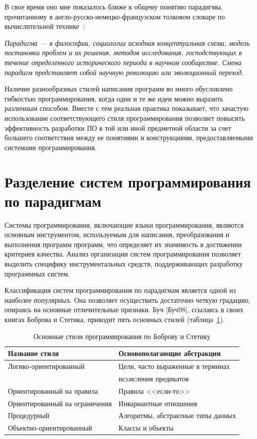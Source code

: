В свое время оно мне показалось ближе к общему понятию парадигмы, прочитанному в англо-русско-немецко-французском толковом словаре по вычислительной технике~\cite{ERD-dict}:

\textit{Парадигма --- в философии, социологии исходная концептуальная схема, модель постановки проблем и их решения, методов исследования, господствующих в течение определенного исторического периода в научном сообществе. Смена парадигм представляет собой научную революцию или  эволюционный переход.}

Наличие разнообразных стилей написания программ во много обусловлено гибкостью программирования, когда одни и те же идеи можно выразить различным способом. Вместе с тем реальная практика показывает, что зачастую использование соответствующего стиля программирования позволяет повысить эффективность разработки ПО в той или иной предметной области за счет большего соответствия между ее понятиями и конструкциями, предоставляемыми системами программирования.

\section{Разделение систем программирования по парадигмам}

Системы программирования, включающие языки программирования, являются основным инструментом, используемым для написания, преобразования и выполнения программ программ, что определяет их значимость в достижении критериев качества. Анализ организации систем программирования позволяет выделить специфику инструментальных средств, поддерживающих разработку программных систем.

Классификация систем программирования по парадигмам является одной из наиболее популярных. Она позволяет осуществить достаточно четкую градацию, опираясь на основные отличительные признаки. Буч [Буч98], ссылаясь в своих книгах Боброва и Стетика, приводит пять основных стилей (таблица~\ref{table-par}).

\begin{table}[h]
    \caption{Основные стили программирования по Боброву и Стетику}
    \centering
    \begin{tabular}{ | l | l | }
        \hline
        \textbf{Название стиля} & \textbf{Основополагающие абстракции} \\ \hline
        Логико-ориентированный & Цели, часто выраженные в терминах \\
        & исxисления предикатов \\ \hline
        Ориентированный на правила & Правила <<если-то>> \\ \hline
        Ориентированный на ограничения & Инвариантные отношения \\ \hline
        Процедурный & Алгоритмы, абстрактные типы данных \\ \hline
        Объектно-ориентированный & Классы и объекты \\ \hline
    \end{tabular}
    \label{table-par}
\end{table}

